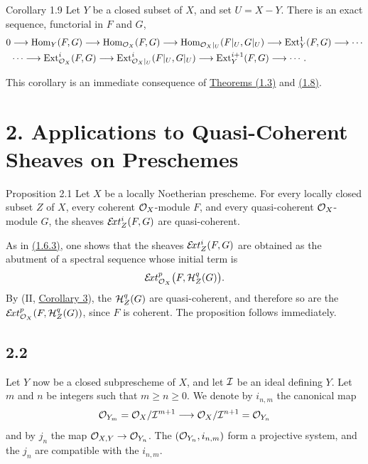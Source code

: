 \begin{sgastatement}{Corollary 1.9}
Let $Y$ be a closed subset of $X$, and set $U=X-Y$. There is an exact
sequence, functorial in $F$ and $G$,
\[
\begin{aligned}
 0&\longrightarrow \operatorname{Hom}_Y(F,G)\longrightarrow \operatorname{Hom}_{\mathcal O_X}(F,G)
 \longrightarrow \operatorname{Hom}_{\mathcal O_X|_U}(F|_U,G|_U)
 \longrightarrow \operatorname{Ext}_Y^1(F,G)\longrightarrow\cdots \\
 &\cdots\longrightarrow \operatorname{Ext}_{\mathcal O_X}^i(F,G)
 \longrightarrow \operatorname{Ext}_{\mathcal O_X|_U}^i(F|_U,G|_U)
 \longrightarrow \operatorname{Ext}_Y^{i+1}(F,G)\longrightarrow\cdots .
\end{aligned}
\]
\end{sgastatement}

This corollary is an immediate consequence of \hyperref[VI.1.3]{Theorems (1.3)} and \hyperref[VI.1.8]{(1.8)}.

\section*{2. Applications to Quasi-Coherent Sheaves on Preschemes}

\begin{sgastatement}{Proposition 2.1}
Let $X$ be a locally Noetherian prescheme. For every locally closed subset
$Z$ of $X$, every coherent $\mathcal O_X$-module $F$, and every quasi-coherent
$\mathcal O_X$-module $G$, the sheaves $\mathcal E\!xt_Z^i(F,G)$ are quasi-coherent.
\end{sgastatement}

As in \hyperref[VI.1.6.3]{(1.6.3)}, one shows that the sheaves $\mathcal E\!xt_Z^i(F,G)$ are obtained
as the abutment of a spectral sequence whose initial term is
\[
 \mathcal E\!xt_{\mathcal O_X}^p\bigl(F,\mathcal H_Z^q(G)\bigr).
\]
By \textup{(II, \hyperref[II.3]{Corollary 3})}, the $\mathcal H_Z^q(G)$ are quasi-coherent, and
therefore so are the $\mathcal E\!xt_{\mathcal O_X}^p(F,\mathcal H_Z^q(G))$, since $F$ is
coherent. The proposition follows immediately.

\subsection*{2.2}
Let $Y$ now be a closed subprescheme of $X$, and let $\mathcal I$ be an ideal
defining $Y$. Let $m$ and $n$ be integers such that $m\geq n\geq 0$. We
denote by $i_{n,m}$ the canonical map
\[
 \mathcal O_{Y_{m}}=\mathcal O_X/\mathcal I^{m+1}\longrightarrow
 \mathcal O_X/\mathcal I^{n+1}=\mathcal O_{Y_{n}}
\]
and by $j_n$ the map $\mathcal O_{X,Y}\to\mathcal O_{Y_{n}}$. The
$(\mathcal O_{Y_{n}},i_{n,m})$ form a projective system, and the $j_n$ are compatible
with the $i_{n,m}$.

